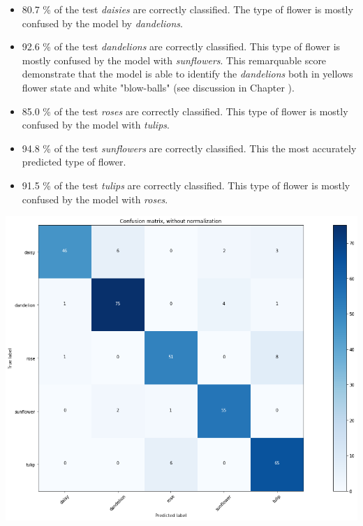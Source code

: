 \begin{itemize}
	\item 80.7 \% of the test \textit{daisies} are correctly classified. The type of flower is mostly confused by the model by \textit{dandelions}.
	\item 92.6 \% of the test \textit{dandelions} are correctly classified. This type of flower is mostly confused by the model with \textit{sunflowers}. This remarquable score demonstrate that the model is able to identify the \textit{dandelions} both in yellows flower state and white "blow-balls" (see discussion in Chapter  ). 
	\item 85.0 \% of the test \textit{roses} are correctly classified. This type of flower is mostly confused by the model with \textit{tulips}.
	\item 94.8 \% of the test \textit{sunflowers} are correctly classified. This the most accurately predicted type of flower. 
	\item 91.5 \% of the test \textit{tulips} are correctly classified. This type of flower is mostly confused by the model with \textit{roses}.
\end{itemize}

\begin{center}
	\includegraphics[scale=.4]{sections/04_results/output_40_2}
	\label{fig:output402}
\end{center}







